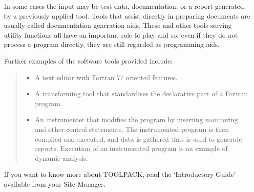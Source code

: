 In some cases the input may be test data, documentation, or a report generated
by a previously applied tool.
Tools that assist directly in preparing documents are usually called
documentation generation aids.
These and other tools serving utility functions all have an important role
to play and so, even if they do not process a program directly, they are
still regarded as programming aids.

Further examples of the software tools provided include:

\begin{small}
\begin{quote}
\begin{itemize}
\item A text editor with Fortran 77 oriented features.
\item A transforming tool that standardises the declarative part of a Fortran
program.
\item An instrumenter that modifies the program by inserting monitoring
and other control statements.
The instrumented program is then compiled and executed, and data is gathered
that is used to generate reports.
Execution of an instrumented program is an example of dynamic analysis.
\end{itemize}
\end{quote}
\end{small}

If you want to know more about TOOLPACK, read the `Introductory Guide'
available from your Site Manager.
